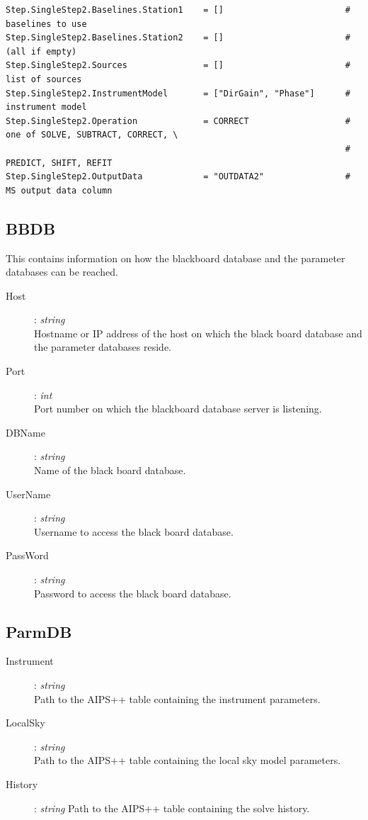 \documentclass[10pt]{lofar}
\begin{document}
{\begin{verbatim}
Step.SingleStep2.Baselines.Station1    = []                        # baselines to use
Step.SingleStep2.Baselines.Station2    = []                        # (all if empty)
Step.SingleStep2.Sources               = []                        # list of sources
Step.SingleStep2.InstrumentModel       = ["DirGain", "Phase"]      # instrument model
Step.SingleStep2.Operation             = CORRECT                   # one of SOLVE, SUBTRACT, CORRECT, \
                                                                   # PREDICT, SHIFT, REFIT
Step.SingleStep2.OutputData            = "OUTDATA2"                # MS output data column
\end{verbatim}
}

\subsection*{BBDB}
\label{app-bbdb}
This contains information on how the blackboard database and the parameter
databases can be reached.
\begin{description}
\item [Host] : \emph{string} \\
    Hostname or IP address of the host on which the black board database and
    the parameter databases reside.
\item [Port] : \emph{int} \\
    Port number on which the blackboard database server is listening.
\item [DBName] : \emph{string} \\
    Name of the black board database.
\item [UserName] : \emph{string} \\
    Username to access the black board database.
\item [PassWord] : \emph{string} \\
    Password to access the black board database.
\end{description}

\subsection*{ParmDB}
\label{app-parmdb}
\begin{description}
\item [Instrument] : \emph{string} \\
    Path to the AIPS++ table containing the instrument parameters.
\item [LocalSky] : \emph{string} \\
    Path to the AIPS++ table containing the local sky model parameters.
\item [History] : \emph{string}
    Path to the AIPS++ table containing the solve history.
\end{description}
\end{document}
